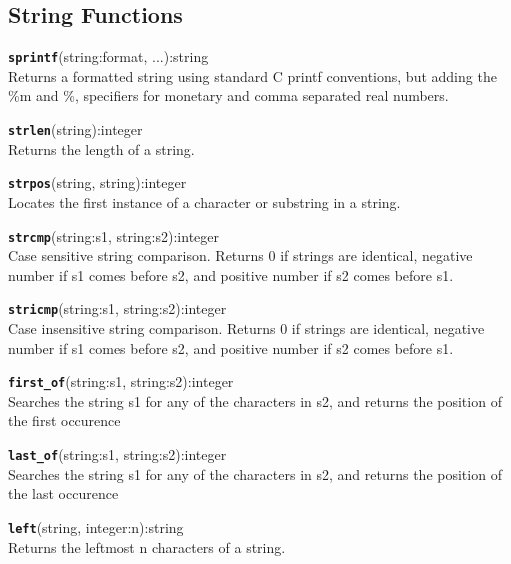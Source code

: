 \subsection{String Functions}
\texttt{{\large\textbf{sprintf}}}\textsf{(string:format, ...):string}\\
 Returns a formatted string using standard C printf conventions, but adding the \%m and \%, specifiers for monetary and comma separated real numbers.

\hrulefill

\texttt{{\large\textbf{strlen}}}\textsf{(string):integer}\\
 Returns the length of a string.

\hrulefill

\texttt{{\large\textbf{strpos}}}\textsf{(string, string):integer}\\
 Locates the first instance of a character or substring in a string.

\hrulefill

\texttt{{\large\textbf{strcmp}}}\textsf{(string:s1, string:s2):integer}\\
 Case sensitive string comparison.  Returns 0 if strings are identical, negative number if s1 comes before s2, and positive number if s2 comes before s1.

\hrulefill

\texttt{{\large\textbf{stricmp}}}\textsf{(string:s1, string:s2):integer}\\
 Case insensitive string comparison.  Returns 0 if strings are identical, negative number if s1 comes before s2, and positive number if s2 comes before s1.

\hrulefill

\texttt{{\large\textbf{first\_of}}}\textsf{(string:s1, string:s2):integer}\\
 Searches the string s1 for any of the characters in s2, and returns the position of the first occurence

\hrulefill

\texttt{{\large\textbf{last\_of}}}\textsf{(string:s1, string:s2):integer}\\
 Searches the string s1 for any of the characters in s2, and returns the position of the last occurence

\hrulefill

\texttt{{\large\textbf{left}}}\textsf{(string, integer:n):string}\\
 Returns the leftmost n characters of a string.

\hrulefill

